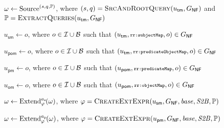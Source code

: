         {
			$\omega \gets \textrm{Source}^{(s,q,\mathbb{P})}$\!,
				where
			$(s, q) = \textsc{SrcAndRootQuery}(u_\mathsf{tm},G_\mathsf{NF})$
			\hspace*{23mm} and $\mathbb{P} = \textsc{ExtractQueries}(u_\mathsf{tm},G_\mathsf{NF})$
			\label{line:rml2algebra:source}

			$u_\textsf{sm} \gets o$, where $o \in \mathcal{I} \cup \mathcal{B}$ such that $(u_\mathsf{tm},\texttt{\scriptsize rr:subjectMap},o) \in G_\mathsf{NF}$ \;

			$u_\textsf{pom} \gets o$, where $o \in \mathcal{I} \cup \mathcal{B}$ such that $(u_\mathsf{tm},\texttt{\scriptsize rr:predicateObjectMap},o) \in G_\mathsf{NF}$ \; 

			$u_\textsf{pm} \gets o$, where $o \in \mathcal{I} \cup \mathcal{B}$ such that $(u_\textsf{pom},\texttt{\scriptsize rr:predicateMap},o) \in G_\mathsf{NF}$ \;

			$u_\mathsf{om} \gets o$, where $o \in \mathcal{I} \cup \mathcal{B}$ such that $(u_\textsf{pom},\texttt{\scriptsize rr:objectMap},o) \in G_\mathsf{NF}$ \;

			$\omega \gets \text{Extend}_{\varphi}^{a_\textrm{s}\!}(\omega)$,
				where
			$\varphi = \textsc{CreateExtExpr}(u_\textsf{sm}, G_\mathsf{NF}, \mathit{base}, \mathit{S2B}, \mathbb{P})$
			\label{line:rml2algebra:extend_for_subject}

			$\omega \gets \text{Extend}_{\varphi}^{a_\textrm{p}\!}(\omega)$,
				where
			$\varphi = \textsc{CreateExtExpr}(u_\textsf{pm}, G_\mathsf{NF}, \mathit{base}, \mathit{S2B}, \mathbb{P})$
			\;%
			\label{line:rml2algebra:extend_for_predicate}

            {

}}
